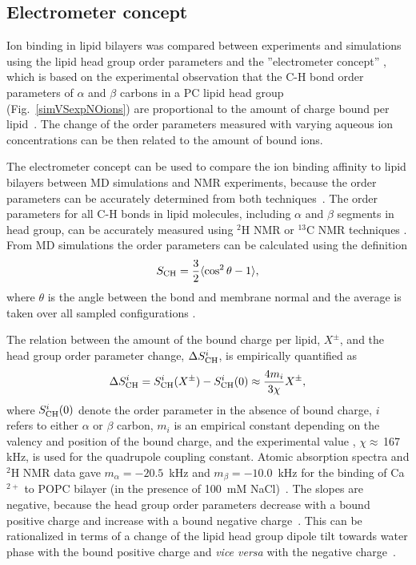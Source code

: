 \documentclass[aip,jcp,twocolumn]{revtex4}
\begin{document}
\subsection{Electrometer concept} \label{section:electrometer}
Ion binding in lipid bilayers was compared between experiments and simulations 
using the lipid head group order parameters and the
''electrometer concept'' \cite{seelig87,catte16}, which
is based on the experimental observation that the C-H bond
order parameters of $\alpha$ and $\beta$ carbons in a PC lipid head group
(Fig.~\ref{simVSexpNOions}) are proportional to the amount 
of charge bound per lipid~\cite{seelig87}.
The change of the order parameters measured with varying aqueous
ion concentrations can be then related to the amount of bound ions.

The electrometer concept can be used to compare the ion binding affinity to lipid 
bilayers between MD simulations and  NMR experiments, because the order
parameters can be accurately determined from both techniques~\cite{catte16,ollila16}.
The order parameters for all C-H bonds in lipid molecules, including
$\alpha$ and $\beta$ segments in head group, can be accurately measured
using $^2$H NMR or $^{13}$C NMR techniques \cite{ollila16}. From MD simulations the
order parameters can be calculated using the definition
\begin{equation}\label{OP}
S_{\rm CH}=\frac{3}{2}\langle \cos^2\theta -1 \rangle,
\end{equation}
where $\theta$ is the angle between the bond and membrane
normal and the average is taken over all sampled configurations \cite{ollila16}.

The relation between the amount of the bound charge per lipid,  $X^\pm$, and
the head group order parameter change, $\Delta S_{\rm{CH}}^{i}$,
is empirically quantified as~\cite{seelig87,ferreira16}
\begin{equation}\label{OPchangeEQ}
  \Delta S_{\rm{CH}}^{i}= S_{\rm{CH}}^{i}(X^\pm)-S_{\rm{CH}}^{i}(0) \approx \frac{4m_i }{3\chi}X^\pm,
\end{equation}
where $S_{\rm{CH}}^{i}(0)$ denote the order parameter in the absence of bound charge,
$i$ refers to either $\alpha$ or $\beta$ carbon,
$m_i$ is an empirical constant depending on the valency and position of the bound charge,
and the experimental value \cite{seelig77,davis83}, $\chi \approx$\,167\,kHz, is used for the quadrupole coupling constant.
Atomic absorption spectra and $^2$H NMR data gave
$m_\alpha=-20.5$~kHz  and $m_\beta=-10.0$~kHz for the binding of
Ca$^{2+}$ to POPC bilayer (in the presence of 100~mM NaCl)~\cite{altenbach84,ollila16,catte16}.
The slopes are negative, because the head group order parameters
decrease with a bound positive charge and increase with a bound negative
charge~\cite{ollila16,catte16}. This can be rationalized in terms of a change
of the lipid head group dipole tilt towards water phase with the bound positive
charge and {\it vice versa} with the negative charge~\cite{seelig87}. 
\end{document}
